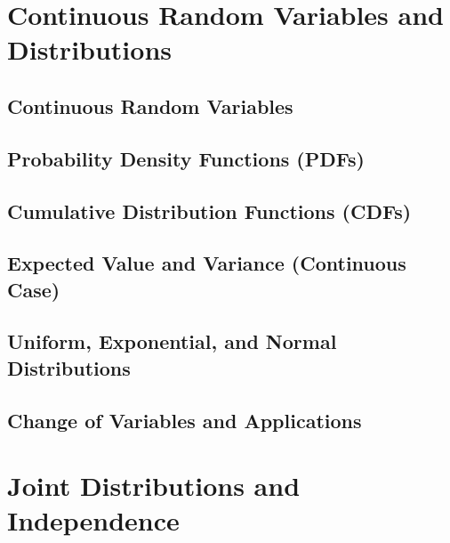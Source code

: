 \documentclass[
  12pt,
]{krantzNoCorner}
\begin{document}
\hypertarget{continuous-random-variables-and-distributions}{%
\chapter{Continuous Random Variables and Distributions}\label{continuous-random-variables-and-distributions}}

\hypertarget{continuous-random-variables}{%
\section{Continuous Random Variables}\label{continuous-random-variables}}

\hypertarget{probability-density-functions-pdfs}{%
\section{Probability Density Functions (PDFs)}\label{probability-density-functions-pdfs}}

\hypertarget{cumulative-distribution-functions-cdfs-1}{%
\section{Cumulative Distribution Functions (CDFs)}\label{cumulative-distribution-functions-cdfs-1}}

\hypertarget{expected-value-and-variance-continuous-case}{%
\section{Expected Value and Variance (Continuous Case)}\label{expected-value-and-variance-continuous-case}}

\hypertarget{uniform-exponential-and-normal-distributions}{%
\section{Uniform, Exponential, and Normal Distributions}\label{uniform-exponential-and-normal-distributions}}

\hypertarget{change-of-variables-and-applications}{%
\section{Change of Variables and Applications}\label{change-of-variables-and-applications}}

\hypertarget{joint-distributions-and-independence}{%
\chapter{Joint Distributions and Independence}\label{joint-distributions-and-independence}}
\end{document}
